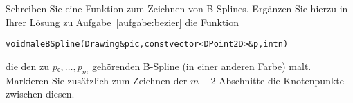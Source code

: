 %
Schreiben Sie eine Funktion zum Zeichnen von B-Splines. Ergänzen Sie
hierzu in Ihrer Lösung zu Aufgabe~\ref{aufgabe:bezier} die Funktion
\begin{alltt}
   void maleBSpline(Drawing& pic, const vector<DPoint2D>& p, int n)
\end{alltt}
die den zu $p₀, …, p_m$ gehörenden B-Spline (in einer anderen Farbe) 
malt. Markieren Sie zusätzlich zum Zeichnen der $m - 2$ Abschnitte die
Knotenpunkte zwischen diesen.

